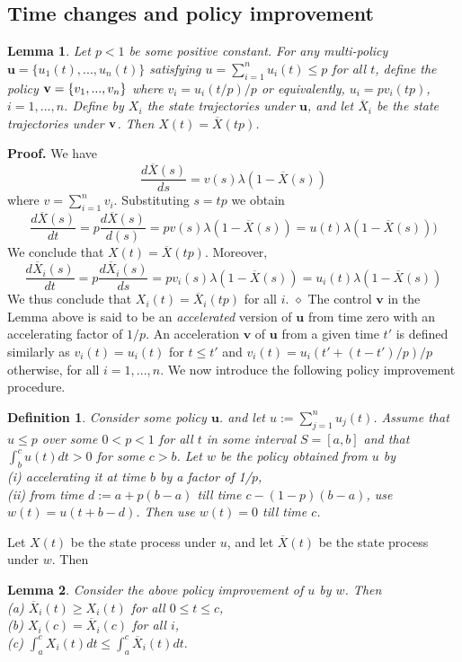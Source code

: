 \documentclass[10pt,twocolumn,conference,final]{IEEEtran}
\def\endpf{\hfill$\diamond$}
\newtheorem{definition}{Definition}[section]
\newtheorem{lma}{Lemma}[section]
\newcommand{\ubf}{\mathbf u}
\begin{document}
\subsection{Time changes and policy improvement}
\begin{lma}\label{accell}
Let $p<1$ be some positive constant.
For any multi-policy ${\ubf }= \{u_1 (t) , ... , u_n (t) \} $ satisfying
$u=\sum_{i=1}^n u_i (t) \leq p $ for all $t$,
define the policy ${\bf v} = \{ v_1 , ... , v_n \}$
where $v_i = u_i (t/p) / p $ or equivalently, $u_i = p v_i (tp)$,
$i=1,...,n$.  Define by $X_i$ the state trajectories under $\ubf$, and let
$\overline X_i$ be the state trajectories under ${\bf v}$.
Then $ X(t) = \overline X( tp ) $.
\end{lma}
{\bf Proof.}
We have
\[
\frac {d {\overline X}(s) }{ds}= v(s) \lambda ( 1 - \overline X(s))
\]
where $v=\sum_{i=1}^n v_i$. Substituting $s=tp$ we obtain
\[
\frac{ d \overline X (s) }{ dt } =
p \frac{ d {\overline X}(s ) }{d (s) }
= p v( s) \lambda ( 1 - \overline X(s) ) =
u(t) \lambda ( 1 - \overline X(s ) ))
\]
We conclude that $ X(t) = \overline X( tp ) $. Moreover,
\[
\frac{ d {\overline X}_i (s) } { dt } =
p \frac{ d {\overline X}_i (s)}{ds}  = p v_i ( s) \lambda
( 1 - \overline X(s ) ) =
u_i (t) \lambda ( 1 - \overline X(s ) )
\]
We thus conclude that $ X_i (t) = \overline  X_i ( t p ) $ for all $i$.
\endpf
The control $\mathbf v$ in the Lemma above is said to be an {\em accelerated} version of $\ubf$
from time zero with an accelerating factor of $1/p$. An acceleration $\mathbf v$ of $\ubf$
from a given time $t'$ is defined similarly as
$v_i (t)=u_i (t) $ for $t \leq t'$ and $v_i ( t)= u_i (t' + (t-t')/p) / p $ otherwise,
for all $i=1,...,n$.
We now introduce the following policy improvement procedure.
\begin{definition}
Consider some policy $\ubf$.
and let $u := \sum_{j=1}^n u_j(t)$. Assume that
$u \leq p $ over some $0<p<1$ for all $t$ in
some  interval $S = [a,b] $
and that $\int_b^c u(t) dt > 0 $ for some $c>b$.
Let $w$ be the policy obtained from $u$ by
\\
(i) accelerating it at time $b$ by a factor of 1/$p$,
\\
(ii) from time $d:=a + p(b-a)$ till time $c-(1-p)(b-a)$, use
$w(t ) = u(t + b - d )$. Then use $w(t)=0$ till time $c$.
\end{definition}
Let $ X(t)$ be the state process under $u$, and let
$ \overline X(t)$ be the state process under $w$. Then
\\
\begin{lma}\label{improve}
Consider the above policy improvement of $u$ by $w$. Then
\\
(a) $\overline X_i(t) \geq X_i(t) $ for all $0\leq t \leq c$,
\\
(b) $X_i(c) = \overline X_i(c) $ for all $i$,
\\
(c) $\int_a^c X_i (t) dt \leq \int_a^c \overline X_i (t)  dt .$
\end{lma}
\end{document}
